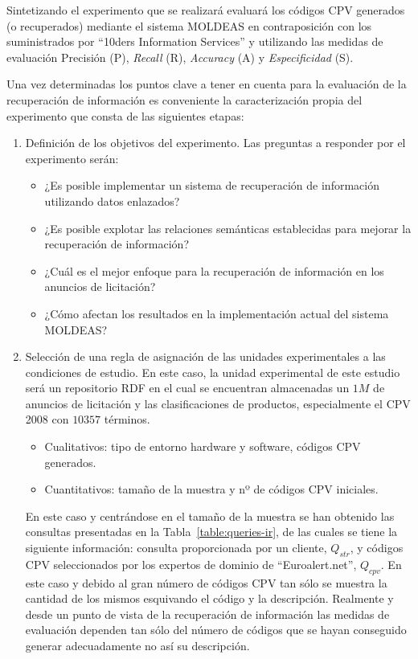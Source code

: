 Sintetizando el experimento que se realizará evaluará los códigos CPV generados (o recuperados) mediante el sistema MOLDEAS en contraposición 
con los suministrados por ``10ders Information Services'' y utilizando las medidas de evaluación Precisión (P), \textit{Recall} (R), \textit{Accuracy} (A) y 
\textit{Especificidad} (S).

Una vez determinadas los puntos clave a tener en cuenta para la evaluación de la recuperación de información es conveniente la caracterización 
propia del experimento que consta de las siguientes etapas:
\begin{enumerate}
 \item Definición de los objetivos del experimento. Las preguntas a responder por el experimento serán:
\begin{itemize}
 \item ¿Es posible implementar un sistema de recuperación de información utilizando datos enlazados?
 \item ¿Es posible explotar las relaciones semánticas establecidas para mejorar la recuperación de información?
 \item ¿Cuál es el mejor enfoque para la recuperación de información en los anuncios de licitación? 
 \item ¿Cómo afectan los resultados en la implementación actual del sistema \gls{MOLDEAS}?
\end{itemize}
 \item Selección de una regla de asignación de las unidades experimentales a las condiciones de estudio. En este caso, 
la unidad experimental de este estudio será un repositorio \gls{RDF} en el cual se encuentran almacenadas 
un $1M$ de anuncios de licitación y las clasificaciones de productos, especialmente el CPV 2008 con $10357$ términos. 
\begin{itemize}
 \item Cualitativos: tipo de entorno hardware y software, códigos CPV generados.
 \item Cuantitativos: tamaño de la muestra y nº de códigos \gls{CPV} iniciales.
\end{itemize}

En este caso y centrándose en el tamaño de la muestra se han obtenido las consultas presentadas en la Tabla~\ref{table:queries-ir}, de las 
cuales se tiene la siguiente información: consulta proporcionada por un cliente, $Q_{str}$, y códigos CPV seleccionados por los expertos 
de dominio de ``Euroalert.net'', $Q_{cpv}$. En este caso y debido al gran número de códigos CPV tan sólo se muestra la cantidad de los mismos esquivando 
el código y la descripción. Realmente y desde un punto de vista de la recuperación de información las medidas de evaluación dependen 
tan sólo del número de códigos que se hayan conseguido generar adecuadamente no así su descripción.


\end{enumerate}
